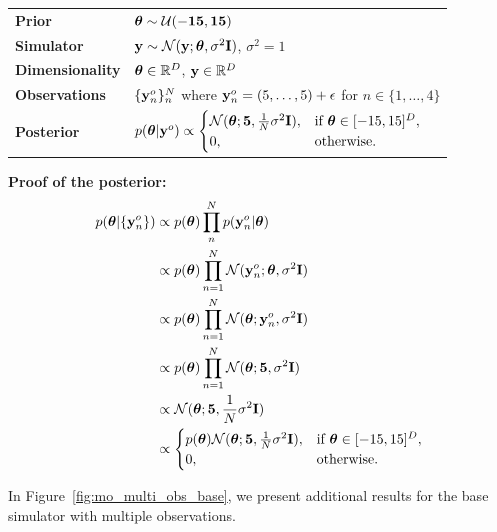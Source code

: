 \begin{tabular}{@{}ll@{}}
  \textbf{Prior} & $\boldsymbol{\theta} \sim \mathcal{U}(-\mathbf{15}, \mathbf{15})$ \\ [5pt]
  \textbf{Simulator} & $\mathbf{y} \sim \mathcal{N}(\mathbf{y}; \boldsymbol{\theta}, \sigma^2 \mathbf{I})$, $\sigma^2=1$ \\ [5pt]
  \textbf{Dimensionality} & $\boldsymbol{\theta} \in \mathbb{R}^{D}$, $\mathbf{y} \in \mathbb{R}^{D}$ \\ [5pt]
  \textbf{Observations} & $\{\mathbf{y}^o_n\}_n^N$ where $\mathbf{y}^o_n = (5, \ldots, 5) + \epsilon$ for $n \in \{1, \ldots, 4\}$ \\ [5pt]
  \textbf{Posterior} & $ p(\boldsymbol{\theta} | \mathbf{y}^o) \propto
                                    \begin{cases}
                                      \mathcal{N}(\boldsymbol{\theta}; \mathbf{5}, \frac{1}{N}\sigma^2 \mathbf{I}), & \text{if } \boldsymbol{\theta} \in [-15, 15]^D, \\
                                      0, & \text{otherwise}.
                                    \end{cases} $ \\ [5pt]
\end{tabular}

\textbf{Proof of the posterior:}
\begin{align}
  p(\boldsymbol{\theta}|\{\mathbf{y}^o_n\})
  &\propto p(\boldsymbol{\theta}) \prod_n^{N} p(\mathbf{y}^o_n | \boldsymbol{\theta}) \label{eq:mog_mult_obs-1} \\
  &\propto p(\boldsymbol{\theta}) \prod_{n=1}^{N} \mathcal{N}(\mathbf{y}^o_n; \boldsymbol{\theta}, \sigma^2 \mathbf{I}) \label{eq:mog_mult_obs-2} \\
  &\propto p(\boldsymbol{\theta}) \prod_{n=1}^{N} \mathcal{N}(\boldsymbol{\theta}; \mathbf{y}^o_n, \sigma^2 \mathbf{I}) \label{eq:mog_mult_obs-3} \\
  &\propto p(\boldsymbol{\theta}) \prod_{n=1}^{N} \mathcal{N}(\boldsymbol{\theta}; \mathbf{5}, \sigma^2 \mathbf{I}) \label{eq:mog_mult_obs-4} \\
  &\propto \mathcal{N}(\boldsymbol{\theta}; \mathbf{5}, \frac{1}{N}\sigma^2 \mathbf{I}) \label{eq:mog_mult_obs-5} \\
  &\propto
    \begin{cases}
      p(\boldsymbol{\theta}) \mathcal{N}(\boldsymbol{\theta}; \mathbf{5}, \frac{1}{N}\sigma^2 \mathbf{I}), & \text{if } \boldsymbol{\theta} \in [-15, 15]^D, \\
      0, & \text{otherwise}.
    \end{cases}
    \label{eq:mog_mult_obs}
\end{align}

In Figure~\ref{fig:mo_multi_obs_base}, we present additional results for the base simulator with multiple observations.

